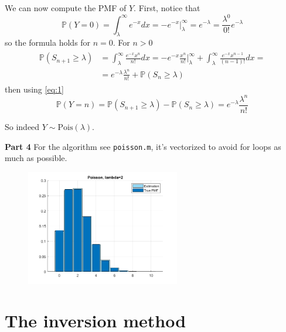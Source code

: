 \documentclass[12pt]{article}
\begin{document}
We can now compute the PMF of $Y$. First, notice that 
\begin{equation}
    \mathbb{P}(Y = 0) =\int_{\lambda}^{\infty}{e^{-x} dx} = -e^{-x} \Big|_{\lambda}^{\infty} = e^{-\lambda} = \frac{\lambda^0}{0!}e^{-\lambda}
\end{equation}
so the formula holds for $n= 0$. For $n > 0$ 
\begin{align}
\begin{split}
    \mathbb{P}(S_{n+1} \geq \lambda)&= \int_{\lambda}^{\infty}{\frac{e^{-x}x^{n}}{n!} dx} = - e^{-x} \frac{x^{n}}{n!} \Big|_{\lambda}^{\infty} +\int_{\lambda}^{\infty}{\frac{e^{-x}x^{n-1}}{(n-1)!} dx} = \\
    &= e^{-\lambda} \frac{\lambda^n}{n!} + \mathbb{P}(S_{n} \geq \lambda)
\end{split}
\end{align}
then using \eqref{eq:1}
\begin{equation}
    \mathbb{P}(Y = n) = \mathbb{P}(S_{n+1} \geq \lambda) - \mathbb{P}(S_{n} \geq \lambda) = e^{-\lambda} \frac{\lambda^n}{n!} 
\end{equation}

So indeed $Y \sim \text{Pois}(\lambda)$.

\noindent \textbf{Part 4} For the algorithm see \verb|poisson.m|, it's vectorized to avoid for loops as much as possible.

\begin{figure}[h!]
    \centering
    \includegraphics[width=0.6\textwidth]{plot2.png}
\end{figure}

\newpage
\section*{The inversion method}
\setcounter{equation}{0}
\end{document}
